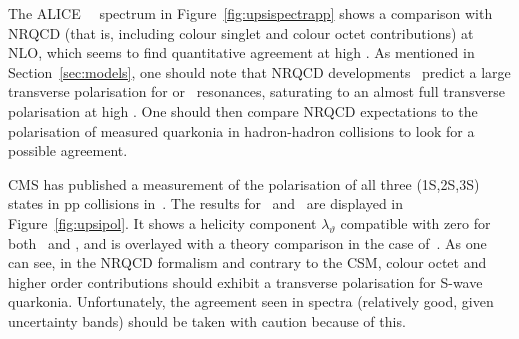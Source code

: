 The ALICE \PgUa~\pt~spectrum in Figure~\ref{fig:upsispectrapp} shows a
comparison with NRQCD (that is, including colour singlet and
colour octet contributions) at NLO, which seems to find quantitative agreement
at high \pt. As mentioned in Section~\ref{sec:models}, one should note that NRQCD developments~%
predict a large transverse polarisation for \Jpsi or \PgU\ resonances, saturating
to an almost full transverse polarisation at high \pt. One should then
compare NRQCD expectations to the polarisation of measured quarkonia
in hadron-hadron collisions to look for a possible agreement.



CMS has published a measurement of the polarisation of all three
\PgU(1S,2S,3S) states in pp collisions in~\cite{CMSupsipol}. The
results for \PgUa\ and \PgUc\ are displayed in Figure~\ref{fig:upsipol}. It shows a helicity component $\lambda_{\vartheta}$ compatible with
zero for both \PgUa\ and \PgUc, and is overlayed with a theory
comparison in the case of~\PgUc. As one can see, in the NRQCD
formalism and contrary to the CSM, colour octet and higher order
contributions should exhibit a transverse polarisation for S-wave
quarkonia. Unfortunately, the agreement seen in \pt spectra
(relatively good, given uncertainty bands) should be taken with
caution because of this.
